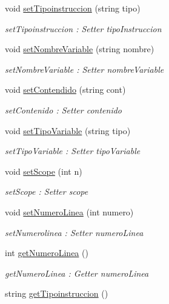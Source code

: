 \begin{DoxyCompactItemize}
\item 
void \hyperlink{class_grafo_a7028a1b99b3548e119003cce12640586}{set\+Tipoinstruccion} (string tipo)
\begin{DoxyCompactList}\small\item\em set\+Tipoinstruccion \+: Setter tipo\+Instruccion \end{DoxyCompactList}\item 
void \hyperlink{class_grafo_ac3322d759687035f85d40c2ddd59dc22}{set\+Nombre\+Variable} (string nombre)
\begin{DoxyCompactList}\small\item\em set\+Nombre\+Variable \+: Setter nombre\+Variable \end{DoxyCompactList}\item 
void \hyperlink{class_grafo_abc2baed5d63c8facb36b3e5cd7d7c955}{set\+Contendido} (string cont)
\begin{DoxyCompactList}\small\item\em set\+Contenido \+: Setter contenido \end{DoxyCompactList}\item 
void \hyperlink{class_grafo_aca4e8e9a366c63bd4b9c3514ecb70ddc}{set\+Tipo\+Variable} (string tipo)
\begin{DoxyCompactList}\small\item\em set\+Tipo\+Variable \+: Setter tipo\+Variable \end{DoxyCompactList}\item 
void \hyperlink{class_grafo_a9ee20627b1e102ec7e0d71fd8e594425}{set\+Scope} (int n)
\begin{DoxyCompactList}\small\item\em set\+Scope \+: Setter scope \end{DoxyCompactList}\item 
void \hyperlink{class_grafo_ae96b6e86ed5142e1731a7bea86af1b99}{set\+Numero\+Linea} (int numero)
\begin{DoxyCompactList}\small\item\em set\+Numerolinea \+: Setter numero\+Linea \end{DoxyCompactList}\item 
int \hyperlink{class_grafo_a66836f6c39c09b3ba00e85f27ee6b67f}{get\+Numero\+Linea} ()
\begin{DoxyCompactList}\small\item\em get\+Numero\+Linea \+: Getter numero\+Linea \end{DoxyCompactList}\item 
string \hyperlink{class_grafo_afbc7efa2985a7e644846c68471d94f1a}{get\+Tipoinstruccion} ()

\end{DoxyCompactItemize}

